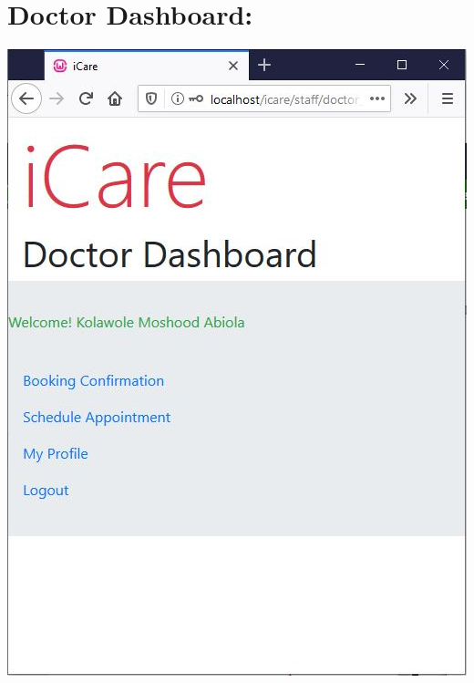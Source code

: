 \documentclass[a4paper,12pt]{report}
\begin{document}
\section*{Doctor Dashboard:}
\includegraphics[scale=0.8]{Implementation/doctorDashboard.JPG}
\end{document}
